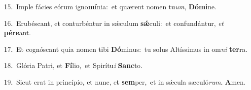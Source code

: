 {\numbfont\textcolor{\numbcolor}{15.}}~Imple fácies eórum igno\-\textbf{mí}\-nia:~\star et quærent nomen tu\-\textit{um}\-, \textbf{Dó}\-\textbf{mi}ne.\par
{\numbfont\textcolor{\numbcolor}{16.}}~Erubéscant, et conturbéntur in sǽculum \textbf{sǽ}\-culi:~\star et confundántur, \textit{et} \textbf{pér}\-\textbf{e}ant.\par
{\numbfont\textcolor{\numbcolor}{17.}}~Et cognóscant quia nomen tibi \textbf{Dó}\-minus:~\star tu solus Altíssimus in om\textit{ni} \textbf{ter}\-ra.\par
{\numbfont\textcolor{\numbcolor}{18.}}~Glória Patri, et \textbf{Fí}\-lio,~\star et Spirítu\textit{i} \textbf{Sanc}\-to.\par
{\numbfont\textcolor{\numbcolor}{19.}}~Sicut erat in princípio, et nunc, et \textbf{sem}\-per,~\star et in sǽcula sæculó\-\textit{rum}\-. \textbf{A}\-men.\par
